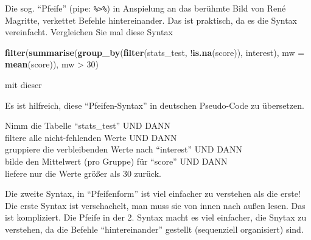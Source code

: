 \documentclass[12pt,ngerman,]{book}
\newenvironment{Shaded}{\begin{snugshade}}{\end{snugshade}}
\newcommand{\KeywordTok}[1]{\textcolor[rgb]{0.13,0.29,0.53}{\textbf{{#1}}}}
\newcommand{\DataTypeTok}[1]{\textcolor[rgb]{0.13,0.29,0.53}{{#1}}}
\newcommand{\DecValTok}[1]{\textcolor[rgb]{0.00,0.00,0.81}{{#1}}}
\newcommand{\StringTok}[1]{\textcolor[rgb]{0.31,0.60,0.02}{{#1}}}
\newcommand{\CommentTok}[1]{\textcolor[rgb]{0.56,0.35,0.01}{\textit{{#1}}}}
\newcommand{\NormalTok}[1]{{#1}}
\renewenvironment{Shaded}{\begin{kframe}}{\end{kframe}}
\let\BeginKnitrBlock\begin \let\EndKnitrBlock\end
\begin{document}
Die sog. ``Pfeife'' (pipe: \texttt{\%\textgreater{}\%}) in
Anspielung an das berühmte Bild von René Magritte, verkettet Befehle
hintereinander. Das ist praktisch, da es die Syntax vereinfacht.
Vergleichen Sie mal diese Syntax

\begin{Shaded}
\begin{Highlighting}[]
\KeywordTok{filter}\NormalTok{(}\KeywordTok{summarise}\NormalTok{(}\KeywordTok{group_by}\NormalTok{(}\KeywordTok{filter}\NormalTok{(stats_test, !}\KeywordTok{is.na}\NormalTok{(score)), interest), }\DataTypeTok{mw =} \KeywordTok{mean}\NormalTok{(score)), mw >}\StringTok{ }\DecValTok{30}\NormalTok{)}
\end{Highlighting}
\end{Shaded}

mit dieser

\begin{Shaded}
\end{Shaded}

Es ist hilfreich, diese ``Pfeifen-Syntax'' in deutschen Pseudo-Code zu
übersetzen.

\BeginKnitrBlock{rmdpseudocode}
Nimm die Tabelle ``stats\_test'' UND DANN\\
filtere alle nicht-fehlenden Werte UND DANN\\
gruppiere die verbleibenden Werte nach ``interest'' UND DANN\\
bilde den Mittelwert (pro Gruppe) für ``score'' UND DANN\\
liefere nur die Werte größer als 30 zurück.
\EndKnitrBlock{rmdpseudocode}

Die zweite Syntax, in ``Pfeifenform'' ist viel einfacher zu verstehen
als die erste! Die erste Syntax ist verschachelt, man muss sie von innen
nach außen lesen. Das ist kompliziert. Die Pfeife in der 2. Syntax macht
es viel einfacher, die Snytax zu verstehen, da die Befehle
``hintereinander'' gestellt (sequenziell organisiert) sind.
\end{document}
